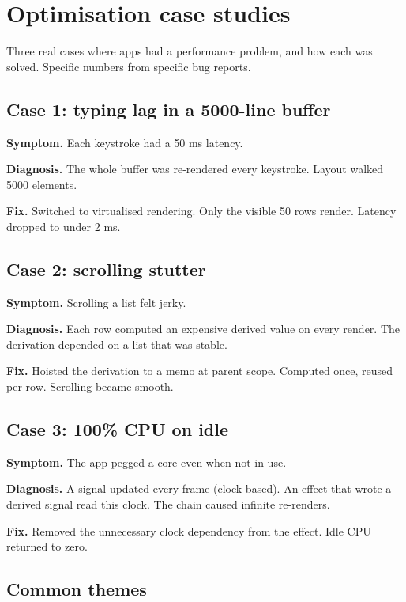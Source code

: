 \chapter{Optimisation case studies}
\label{ch:optcases}

\begin{aside}
Three real cases where \maya{} apps had a performance
problem, and how each was solved. Specific numbers from
specific bug reports.
\end{aside}

\section{Case 1: typing lag in a 5000-line buffer}

\textbf{Symptom.} Each keystroke had a 50 ms latency.

\textbf{Diagnosis.} The whole buffer was re-rendered every
keystroke. Layout walked 5000 elements.

\textbf{Fix.} Switched to virtualised rendering. Only the
visible 50 rows render. Latency dropped to under 2 ms.

\section{Case 2: scrolling stutter}

\textbf{Symptom.} Scrolling a list felt jerky.

\textbf{Diagnosis.} Each row computed an expensive derived
value on every render. The derivation depended on a list
that was stable.

\textbf{Fix.} Hoisted the derivation to a memo at parent
scope. Computed once, reused per row. Scrolling became
smooth.

\section{Case 3: 100\% CPU on idle}

\textbf{Symptom.} The app pegged a core even when not in
use.

\textbf{Diagnosis.} A signal updated every frame
(clock-based). An effect that wrote a derived signal read
this clock. The chain caused infinite re-renders.

\textbf{Fix.} Removed the unnecessary clock dependency from
the effect. Idle CPU returned to zero.

\section{Common themes}

